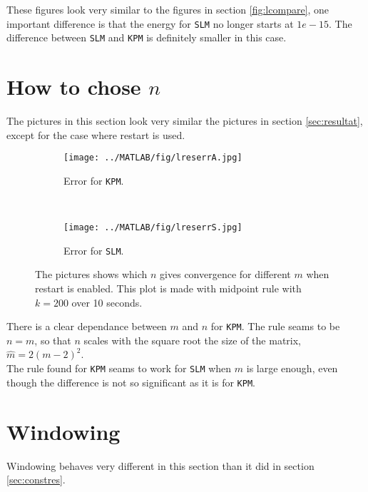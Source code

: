 These figures look very similar to the figures in section \ref{fig:lcompare}, one important difference is that the energy for \texttt{SLM} no longer starts at $1e-15$. The difference between \texttt{SLM} and \texttt{KPM} is definitely smaller in this case.

\section{How to chose $n$}
The pictures in this section look very similar the pictures in section \ref{sec:resultat}, except for the case where restart is used.
\begin{figure}[H]
        \centering
        \begin{subfigure}[b]{0.45\textwidth}
                \texttt{[image: ../MATLAB/fig/lreserrA.jpg]}
                \caption{ Error for \texttt{KPM}. }
                \label{fig:lreserrS}
        \end{subfigure}
		~
		\begin{subfigure}[b]{0.45\textwidth}
                \texttt{[image: ../MATLAB/fig/lreserrS.jpg]}
                \caption{ Error for \texttt{SLM}. }
                \label{fig:lreseneA}
        \end{subfigure}
        \caption{ The pictures shows which $n$ gives convergence for different $m$ when restart is enabled. This plot is made with midpoint rule with $k = 200$ over 10 seconds. }
        \label{fig:tres}

\end{figure}
There is a clear dependance between $m$ and $n$ for \texttt{KPM}. The rule seams to be $n = m$, so that $n$ scales with the square root the size of the matrix, $\hat{m} = 2(m-2)^2$. \\ 
The rule found for \texttt{KPM} seams to work for \texttt{SLM} when $m$ is large enough, even though the difference is not so significant as it is for \texttt{KPM}.%

\section{Windowing}%
Windowing behaves very different in this section than it did in section \ref{sec:constres}.

